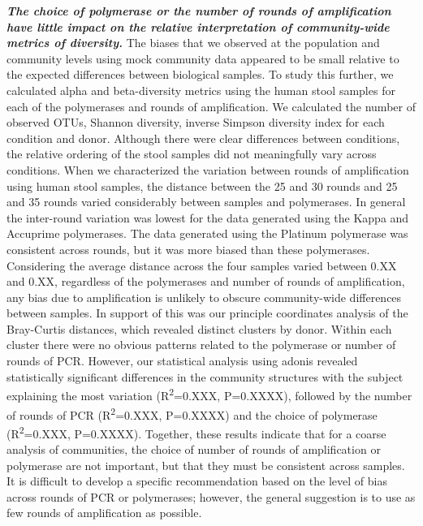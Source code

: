 \documentclass[11,]{article}
\begin{document}
\textbf{\emph{The choice of polymerase or the number of rounds of
amplification have little impact on the relative interpretation of
community-wide metrics of diversity.}} The biases that we observed at
the population and community levels using mock community data appeared
to be small relative to the expected differences between biological
samples. To study this further, we calculated alpha and beta-diversity
metrics using the human stool samples for each of the polymerases and
rounds of amplification. We calculated the number of observed OTUs,
Shannon diversity, inverse Simpson diversity index for each condition
and donor. Although there were clear differences between conditions, the
relative ordering of the stool samples did not meaningfully vary across
conditions. When we characterized the variation between rounds of
amplification using human stool samples, the distance between the 25 and
30 rounds and 25 and 35 rounds varied considerably between samples and
polymerases. In general the inter-round variation was lowest for the
data generated using the Kappa and Accuprime polymerases. The data
generated using the Platinum polymerase was consistent across rounds,
but it was more biased than these polymerases. Considering the average
distance across the four samples varied between 0.XX and 0.XX,
regardless of the polymerases and number of rounds of amplification, any
bias due to amplification is unlikely to obscure community-wide
differences between samples. In support of this was our principle
coordinates analysis of the Bray-Curtis distances, which revealed
distinct clusters by donor. Within each cluster there were no obvious
patterns related to the polymerase or number of rounds of PCR. However,
our statistical analysis using adonis revealed statistically significant
differences in the community structures with the subject explaining the
most variation (R\textsuperscript{2}=0.XXX, P=0.XXXX), followed by the
number of rounds of PCR (R\textsuperscript{2}=0.XXX, P=0.XXXX) and the
choice of polymerase (R\textsuperscript{2}=0.XXX, P=0.XXXX). Together,
these results indicate that for a coarse analysis of communities, the
choice of number of rounds of amplification or polymerase are not
important, but that they must be consistent across samples. It is
difficult to develop a specific recommendation based on the level of
bias across rounds of PCR or polymerases; however, the general
suggestion is to use as few rounds of amplification as possible.
\end{document}
